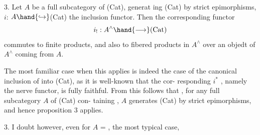 \hand{\uline{\textcolor{black}{Proposition}}} 3. Let $A$ be a full subcategory of (Cat), generat ing (Cat)
by strict epimorphisms, $i$: $A \hand{\hookrightarrow}$(Cat) the inclusion functor. Then the
corresponding functor
\[ i_{!}: A^{\wedge} \hand{\longrightarrow} \text{(Cat)} \]
commutes to finite products, and also to fibered products in $A^{\wedge}$ over an
objedt of $A^{\wedge}$ coming from $A$.

The most familiar case when this applies is indeed the case of the
canonical inclusion of \hand{$\Delta$} into (Cat), as it is well-known that the cor-%
responding $i^{*}$ , namely the nerve functor, is fully faithful. From
this follows that \hand{\uline{\textcolor{black}{a fortiori}}}, for any full subcategory $A$ of (Cat) con-%
taining \hand{$\Delta$} , $A$ generates  (Cat) by strict epimorphisms, and hence
proposition 3 applies.

\hand{\uline{\textcolor{black}{Remark}}} 3. I doubt however, even for $A$ = \hand{$\Delta$}, the most typical case,

